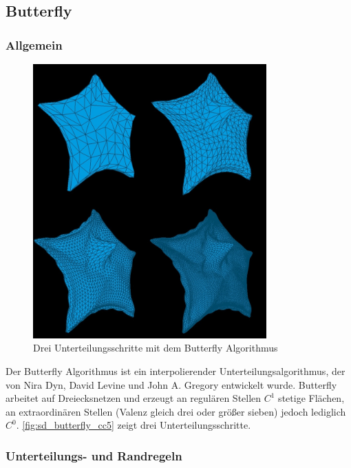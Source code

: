 \subsection{Butterfly} \label{subsec:butterfly}

\subsubsection*{Allgemein}

\begin{figure}
\centering
\includegraphics[width=0.8\textwidth]{content/media/cc5_edge_butterfly.jpg}
\caption{Drei Unterteilungsschritte mit dem Butterfly Algorithmus}
\label{fig:sd_butterfly_cc5}
\end{figure}

Der Butterfly Algorithmus ist ein interpolierender Unterteilungsalgorithmus,
der von Nira Dyn, David Levine und John A. Gregory entwickelt wurde.
Butterfly arbeitet auf Dreiecksnetzen und erzeugt an regulären Stellen
\(C^1\) stetige Flächen, an extraordinären Stellen
(Valenz gleich drei oder größer sieben) jedoch lediglich \(C^0\).
\autoref{fig:sd_butterfly_cc5} zeigt drei Unterteilungsschritte.
\cite[S. 64ff]{Standford.24.07.2015} \cite[S. 72ff]{Zorin.subdivcourse}
\cite{Seeger01asub-atomic}
\cite{Gamasutra}
\cite{Sharp}
\cite{Zorin:1996:ISM:237170.237254}

\subsubsection*{Unterteilungs- und Randregeln}

